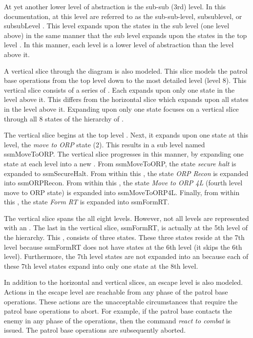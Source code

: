 \documentclass[../../main/main.tex]{subfiles}
\begin{document}
At yet another lower level of abstraction is the sub-sub (3rd) level.  In this documentation,  at this level are referred to as the sub-sub-level, subsublevel, or subsubLevel .  This level expands upon the states in the sub level (one level above) in the same manner that the sub level expands upon the states in the top level .  In this manner, each level is a lower level of abstraction than the level above it. 

A vertical slice through the diagram is also modeled.  This slice models the patrol base operations from the top level down to the most detailed level (level 8).  This vertical slice consists of a series of .  Each  expands upon only one state in the level above it.  This differs from the horizontal slice which expands upon all states in the level above it.  Expanding upon only one state focuses on a vertical slice through all 8 states of the hierarchy of .

The vertical slice begins at the top level .  Next, it expands upon one state at this level, the \textit{move to ORP} state (2).  This results in a sub level  named ssmMoveToORP.  The vertical slice progresses in this manner, by expanding one state at each level into a new .  From ssmMoveToORP, the state \textit{secure halt} is expanded to ssmSecureHalt.  From within this , the state \textit{ORP Recon} is expanded into ssmORPRecon.  From within this , the state \textit{Move to ORP 4L} (fourth level move to ORP state) is expanded into ssmMoveToORP4L.  Finally, from within this , the state \textit{Form RT} is expanded into ssmFormRT.

The vertical slice spans the all eight levels.  However, not all levels are represented with an .  The last  in the vertical slice, ssmFormRT, is actually at the 5th level of the hierarchy.  This , consists of three states.  These three states reside at the 7th level because ssmFormRT does not have states at the 6th level (it skips the 6th level).  Furthermore, the 7th level states are not expanded into an  because each of these 7th level states expand into only one state at the 8th level.  

In addition to the horizontal and vertical slices, an escape level is also modeled.  Actions in the escape level are reachable from any phase of the patrol base operations.  These actions are the unacceptable circumstances that require the patrol base operations to abort.  For example, if the patrol base contacts the enemy in any phase of the operations, then the command \textit{react to combat} is issued.  The patrol base operations are subsequently aborted.  
\end{document}
